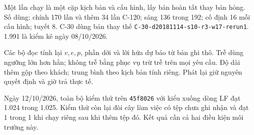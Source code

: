 Một lần chạy là một cặp kịch bản và cấu hình, lấy bản hoàn tất thay bản hỏng. Số dùng: chính 170 lần và thêm 34 lần C-120; sáng 136 trong 192; cố định 16 mỗi cấu hình; tuyết 8. C-30 dùng bản thay thế \nolinkurl{C-30-d20181114-s10-r3-w17-rerun1}. 1.991 là kiểm kê ngày 08/10/2026.

Các bộ đọc tính lại $v,e,p$, phần dời và lời hứa dự báo từ bản ghi thô. Trễ dùng ngưỡng lớn hơn hẳn; không trễ bằng phục vụ trừ trễ trên mọi yêu cầu. Độ dài thêm gộp theo khách; trung bình theo kịch bản tính riêng. Phát lại giữ nguyên quyết định và giờ trả thực tế.

Ngày 12/10/2026, toàn bộ kiểm thử trên \texttt{45f8026} với kiểu xuống dòng LF đạt 1.024 trong 1.025. Kiểm thử còn lại đòi cây làm việc có tệp chưa ghi nhận và đạt 1 trong 1 khi chạy riêng sau khi thêm tệp đó. Kết quả cần cả hai điều kiện môi trường này.
